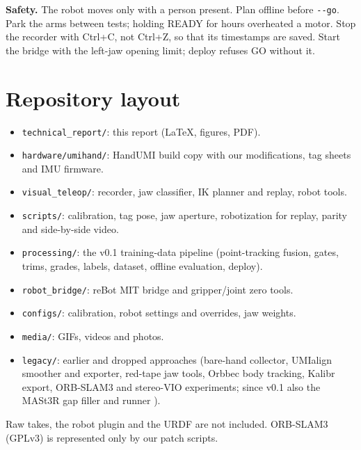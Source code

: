 \documentclass[conference,10pt]{IEEEtran}
\begin{document}
\noindent\textbf{Safety.} The robot moves only with a person present. Plan offline before \texttt{-{}-go}. Park the arms
between tests; holding READY for hours overheated a motor. Stop the recorder with Ctrl+C, not Ctrl+Z, so that its
timestamps are saved. Start the bridge with the left-jaw opening limit; deploy refuses GO without it.

\section{Repository layout}\label{app:repo}
\begin{itemize}
\item \texttt{technical\_report/}: this report (LaTeX, figures, PDF).
\item \texttt{hardware/umihand/}: HandUMI build copy with our modifications, tag sheets and IMU firmware.
\item \texttt{visual\_teleop/}: recorder, jaw classifier, IK planner and replay, robot tools.
\item \texttt{scripts/}: calibration, tag pose, jaw aperture, robotization for replay, parity and side-by-side video.
\item \texttt{processing/}: the v0.1 training-data pipeline (point-tracking fusion, gates, trims, grades, labels, dataset,
  offline evaluation, deploy).
\item \texttt{robot\_bridge/}: reBot MIT bridge and gripper/joint zero tools.
\item \texttt{configs/}: calibration, robot settings and overrides, jaw weights.
\item \texttt{media/}: GIFs, videos and photos.
\item \texttt{legacy/}: earlier and dropped approaches (bare-hand collector, UMIalign smoother and exporter, red-tape jaw
  tools, Orbbec body tracking, Kalibr export, ORB-SLAM3 and stereo-VIO experiments; since v0.1 also the MASt3R gap filler
   and runner ).
\end{itemize}
Raw takes, the robot plugin and the URDF are not included. ORB-SLAM3 (GPLv3) is represented only by our patch scripts.
\end{document}
